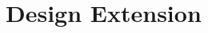 \documentclass[../main.tex]{subfiles}
\begin{document}
\section{Design Extension}

\lipsum[12-13]

\clearpage
\end{document}
